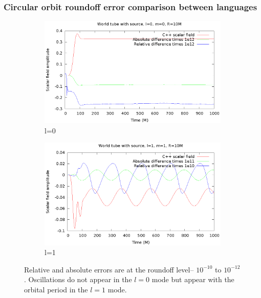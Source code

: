 \documentclass{beamer}
\begin{document}
\begin{frame}
  \frametitle{Circular orbit roundoff error comparison between languages}
  \begin{figure}
    \centering
    \begin{subfigure}{.45\textwidth}
      \centering
      \includegraphics[width=\textwidth]{wtcircl0m0}
      \caption{l=0}
   \end{subfigure}
    \begin{subfigure}{.45\textwidth}
      \centering
      \includegraphics[width=\textwidth]{wtcircl1m1}
      \caption{l=1}
    \end{subfigure}
  \caption{Relative and absolute errors are at the roundoff level-- $10^{-10}$ to $10^{-12}$. Oscillations do not appear in the $l=0$ mode but appear with the orbital period in the $l=1$ mode.}
  \end{figure}
\end{frame}
\end{document}

